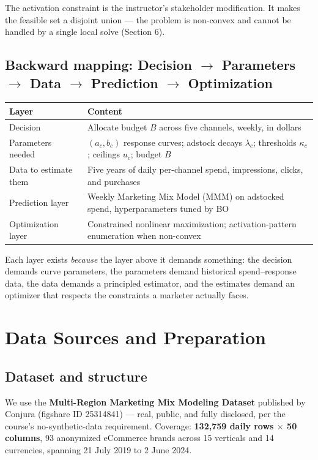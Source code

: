 \documentclass[11pt]{article}
\begin{document}
The activation constraint is the instructor's stakeholder modification. It makes the feasible set a disjoint union --- the problem is non-convex and cannot be handled by a single local solve (Section 6).

\subsection{Backward mapping: Decision $\rightarrow$ Parameters $\rightarrow$ Data $\rightarrow$ Prediction $\rightarrow$ Optimization}

\begin{center}
\begin{tabular}{ll}
\toprule
\textbf{Layer} & \textbf{Content} \\
\midrule
Decision & Allocate budget $B$ across five channels, weekly, in dollars \\
Parameters needed & $(a_c, b_c)$ response curves; adstock decays $\lambda_c$; thresholds $\kappa_c$; ceilings $u_c$; budget $B$ \\
Data to estimate them & Five years of daily per-channel spend, impressions, clicks, and purchases \\
Prediction layer & Weekly Marketing Mix Model (MMM) on adstocked spend, hyperparameters tuned by BO \\
Optimization layer & Constrained nonlinear maximization; activation-pattern enumeration when non-convex \\
\bottomrule
\end{tabular}
\end{center}

Each layer exists \emph{because} the layer above it demands something: the decision demands curve parameters, the parameters demand historical spend--response data, the data demands a principled estimator, and the estimates demand an optimizer that respects the constraints a marketer actually faces.

\section{Data Sources and Preparation}

\subsection{Dataset and structure}

We use the \textbf{Multi-Region Marketing Mix Modeling Dataset} published by Conjura (figshare ID 25314841) --- real, public, and fully disclosed, per the course's no-synthetic-data requirement. Coverage: \textbf{132{,}759 daily rows $\times$ 50 columns}, 93 anonymized eCommerce brands across 15 verticals and 14 currencies, spanning 21 July 2019 to 2 June 2024.
\end{document}

